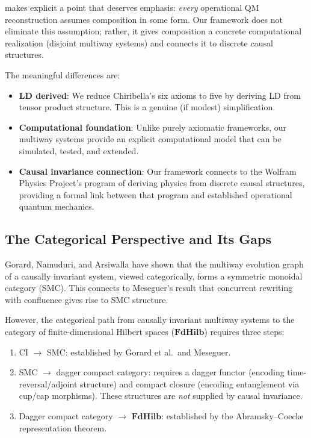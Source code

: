 \documentclass[11pt,a4paper]{article}
\theoremstyle{definition}
\theoremstyle{remark}
\begin{document}
 makes explicit a point that deserves
emphasis: \textit{every} operational QM reconstruction assumes
composition in some form. Our framework does not eliminate this
assumption; rather, it gives composition a concrete computational
realization (disjoint multiway systems) and connects it to discrete
causal structures.

The meaningful differences are:
\begin{itemize}
\item \textbf{LD derived}: We reduce Chiribella's six axioms to five by
  deriving LD from tensor product structure. This is a genuine (if
  modest) simplification.
\item \textbf{Computational foundation}: Unlike purely axiomatic
  frameworks, our multiway systems provide an explicit computational
  model that can be simulated, tested, and extended.
\item \textbf{Causal invariance connection}: Our framework connects to
  the Wolfram Physics Project's program of deriving physics from
  discrete causal structures, providing a formal link between that
  program and established operational quantum mechanics.
\end{itemize}

\subsection{The Categorical Perspective and Its Gaps}

Gorard, Namuduri, and Arsiwalla \cite{gorard2021categorical} have shown that
the multiway evolution graph of a causally invariant system, viewed
categorically, forms a symmetric monoidal category (SMC). This connects
to Meseguer's \cite{meseguer1992conditional} result that concurrent rewriting with confluence
gives rise to SMC structure.

However, the categorical path from causally invariant multiway systems
to the category of finite-dimensional Hilbert spaces ($\mathbf{FdHilb}$)
requires three steps:
\begin{enumerate}
\item CI $\to$ SMC: established by Gorard et al.\ and Meseguer.
\item SMC $\to$ dagger compact category: requires a dagger functor
  (encoding time-reversal/adjoint structure) and compact closure
  (encoding entanglement via cup/cap morphisms). These structures are
  \textit{not} supplied by causal invariance.
\item Dagger compact category $\to$ $\mathbf{FdHilb}$: established by
  the Abramsky--Coecke \cite{abramsky2004categorical} representation theorem.
\end{enumerate}
\end{document}
